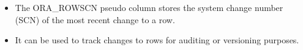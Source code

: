 \setlength{\columnsep}{3pt}
\begin{flushleft}
	
	\begin{itemize}
		\item The ORA\_ROWSCN pseudo column stores the system change number (SCN) of the most recent change to a row. 
		\item It can be used to track changes to rows for auditing or versioning purposes.	
		\bigskip
	\end{itemize}
	
	
\end{flushleft}

